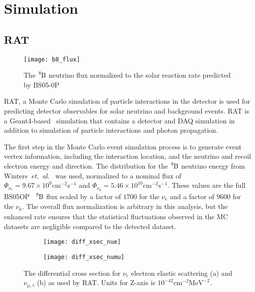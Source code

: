 \chapter{Simulation}
\label{sec:simulation}
\section{RAT}
\begin{figure}[htbp]
\centering
\texttt{[image: b8\_flux]}
\caption[Expected $\ce{^{8}B}$ Flux]{The $\ce{^{8}B}$ neutrino flux
normalized to the solar reaction rate predicted by BS05-0P~\citep{bs_ssm}}
\label{fig:b8_flux}
\end{figure}

RAT, a Monte Carlo simulation of particle interactions in the detector is used
for predicting detector observables for solar neutrino and background events.
RAT is a Geant4-based~\citep{geant4} simulation that
contains a detector and DAQ simulation in addition to simulation of particle
interactions and photon propagation.

The first step in the Monte Carlo event simulation process is to generate
event vertex information, including the interaction location, and the neutrino
and recoil electron energy and direction.
The distribution for the $\ce{^{8}B}$ neutrino energy from Winters~\textit{et.\ al.}~\citep{winterspectrum}
was used, normalized to a nominal flux of
$\Phi_{\nu_{\mathrm{e}}} = 9.67\times10^{9}\mathrm{cm}^{-2}\mathrm{s}^{-1}$
and
$\Phi_{\nu_{\mathrm{\mu}}} = 5.46\times10^{10}\mathrm{cm}^{-2}\mathrm{s}^{-1}$.
These values are the full BS05OP~\cite{bs_ssm} $\ce{^{8}B}$ flux scaled by a factor
of $1700$ for the $\nu_{\mathrm{e}}$ and a factor of $9600$ for the $\nu_{\mathrm{\mu}}$.
The overall flux normalization is arbitrary in this analysis, but the enhanced rate
ensures that the statistical fluctuations observed in the MC datasets are
negligible compared to the detected dataset.

\begin{figure}[htbp]
  \centering
  \begin{subfigure}[b]{0.48\textwidth}
    \centering
  \texttt{[image: diff\_xsec\_nue]}
    \caption[$\nu_{e}$ Differential Cross Section]{}
    \label{fig:diff_xsec_nue}
  \end{subfigure}
  \hfill
  \begin{subfigure}[b]{0.48\textwidth}
    \centering
  \texttt{[image: diff\_xsec\_numu]}
    \caption[$\nu_{\mu}$ Differential Cross Section]{}
    \label{fig:diff_xsec_numu}
  \end{subfigure}
    \caption[ES Differential Cross Section]{The differential cross section for $\nu_{e}$ electron
    elastic scattering (a) and $\nu_{\mu\mathrm{,}\tau}$ (b) as used by
    RAT. Units for Z-axis is $10^{-42} \mathrm{cm}^{-2} \mathrm{MeV}^{-2}$.}
    \label{fig:diff_xsec}
\end{figure}

